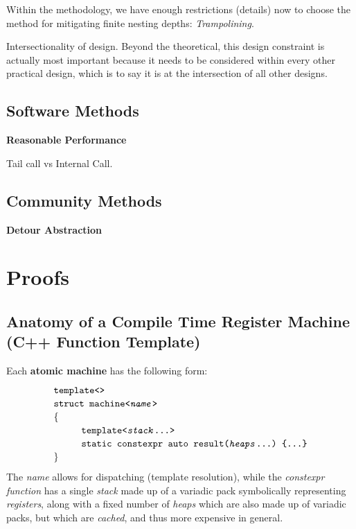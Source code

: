\documentclass[twoside]{article}
\newcommand{\strong}[1]{{\bfseries #1}}
\newcommand{\tab}[1][1.125cm]{\hspace{#1}}
\begin{document}
Within the methodology, we have enough restrictions (details) now to choose the method for mitigating finite
nesting depths: \emph{Trampolining}.

Intersectionality of design. Beyond the theoretical, this design constraint is actually most important because
it needs to be considered within every other practical design, which is to say it is at the intersection of all
other designs.

\subsection*{Software Methods}

\strong{Reasonable Performance}

Tail call vs Internal Call.

\subsection*{Community Methods}

\strong{Detour Abstraction}

\section*{Proofs}

\subsection*{Anatomy of a Compile Time Register Machine (C++ Function Template)}

\noindent Each \strong{atomic machine} has the following form:
$$ \def\arraystretch{1.15}
\tab[0cm] \begin{array}{l}
\texttt{template<>}									\\
\texttt{struct machine<\emph{name}>}							\\
\{											\\
\tab[1cm]\texttt{template<\emph{stack}\ldots>}						\\
\tab[1cm]\texttt{static constexpr auto result(\emph{heaps}\ldots)\ \{\ldots\}}		\\
\}
\end{array} $$
The \emph{name} allows for dispatching (template resolution), while the \emph{constexpr function}
has a single \emph{stack} made up of a variadic pack symbolically representing \emph{registers},
along with a fixed number of \emph{heaps} which are also made up of variadic packs, but which
are \emph{cached}, and thus more expensive in general.
\end{document}
